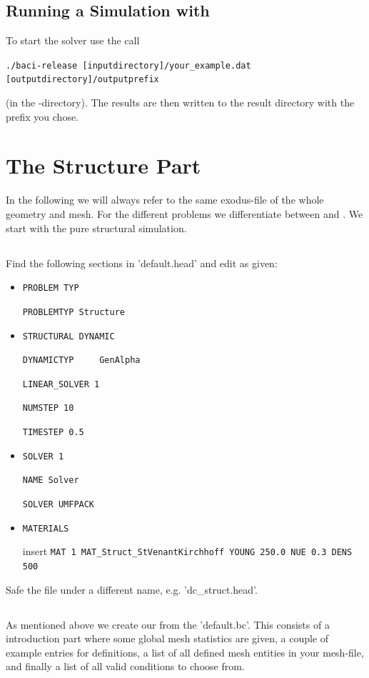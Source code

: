 \subsection{Running a Simulation with \baci{}}
\label{tut_fsi_preexo:baci}
To start the solver use the call 
\begin{center}
	\verb|./baci-release [inputdirectory]/your_example.dat [outputdirectory]/outputprefix|
\end{center}
(in the \baci{}-directory). The results are then written to
the result directory with the prefix you chose.

\section{The Structure Part}

In the following we will always refer to the same exodus-file of the whole
geometry and mesh. For the different problems we differentiate between \head and
\bc. We start with the pure structural simulation.

\subsection{\head}
Find the following sections in 'default.head' and edit as given:

\begin{itemize}
 \item \verb|PROBLEM TYP|

 \verb|PROBLEMTYP Structure|

 \item \verb|STRUCTURAL DYNAMIC|

 \verb|DYNAMICTYP     GenAlpha|

 \verb|LINEAR_SOLVER 1|

 \verb|NUMSTEP 10|

 \verb|TIMESTEP 0.5|

 \item \verb|SOLVER 1|
 
 \verb|NAME Solver|

 \verb|SOLVER UMFPACK|

 \item \verb|MATERIALS|

  insert \verb|MAT 1 MAT_Struct_StVenantKirchhoff YOUNG 250.0 NUE 0.3 DENS 500|
 
\end{itemize}
Safe the file under a different name, e.g. 'dc\_struct.head'.


\subsection{\bc}
As mentioned above we create our \bc from the 'default.bc'. This consists of a
introduction part where some global mesh statistics are given, a couple of
example entries for definitions, a list of all defined mesh entities in
your mesh-file, and finally a list of all valid \baci{} conditions to choose
from.

